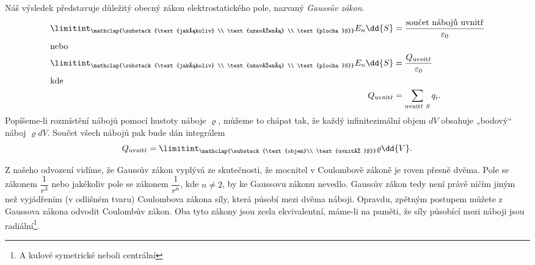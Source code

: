     Náš výsledek představuje důležitý obecný zákon elektrostatického pole, nazvaný \emph{Gaussův zákon}.
    \begin{align}
      \limitint_{\mathclap{\substack{\text{jakákoliv}      \\
                                     \text{uzavřená}       \\
                                     \text{plocha }S}}} E_n\dd{S} 
              &= \frac{\text{součet nábojů uvnitř}}{\varepsilon_0} \label{fyz:eq1001} \\
      \shortintertext{nebo}        
      \limitint_{\mathclap{\substack{\text{jakákoliv}       \\
                                            \text{uzavřená} \\
                                            \text{plocha }S}}} E_n\dd{S}
              &= \frac{Q_{\text{uvnitř}}}{\varepsilon_0}           \label{fyz:eq1002} \\
      \shortintertext{kde}
      Q_{\text{uvnitř}} 
              &= \sum\limits_{\text{uvnitř }S}q_i.                 \label{fyz:eq1003} 
    \end{align}
    Popíšeme-li rozmístění nábojů pomocí hustoty náboje \(\varrho\), můžeme to chápat tak, že každý 
    infinitezimální objem \(dV\) obsahuje „bodový“ náboj \(\varrho dV\). Součet všech nábojů pak 
    bude dán integrálem
    \begin{equation}\label{fyz:fey_eq_elstat37}
     Q_{\text{uvnitř}} = \limitint_{\mathclap{\substack{\text{objem}\\
                                                 \text{uvnitř }S}}} \varrho\dd{V}.
    \end{equation}
    
    Z našeho odvození vidíme, že Gaussův zákon vyplývá ze skutečnosti, že mocnitel v Coulombově 
    zákoně je roven přesně dvěma. Pole se zákonem \(\dfrac{1}{r^3}\) nebo jakékoliv pole se zákonem 
    \(\dfrac{1}{r^n}\), kde \(n\neq2\), by ke Gaussovu zákonu nevedlo. Gaussův zákon tedy není 
    právě ničím jiným než vyjádřením (v odlišném tvaru) Coulombova zákona síly, která působí mezi 
    dvěma náboji. Opravdu, zpětným postupem můžete z Gaussova zákona odvodit Coulombův zákon. Oba 
    tyto zákony jsou zcela ekvivalentní, máme-li na paměti, že síly působící mezi náboji jsou 
    radiální\footnote{A kulové symetrické neboli centrální}.
    

